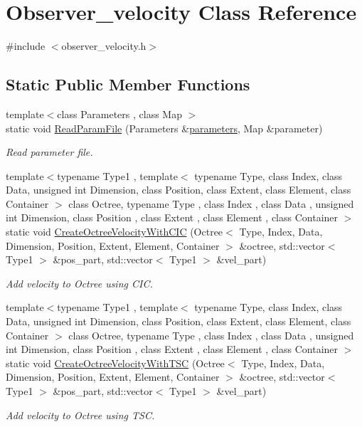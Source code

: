 \hypertarget{classObserver__velocity}{\section{Observer\-\_\-velocity Class Reference}
\label{classObserver__velocity}
}


{\ttfamily \#include $<$observer\-\_\-velocity.\-h$>$}

\subsection*{Static Public Member Functions}
\begin{DoxyCompactItemize}
\item 
{\footnotesize template$<$class Parameters , class Map $>$ }\\static void \hyperlink{classObserver__velocity_acafaae5aa6e6af9cadd712f54f08821e}{Read\-Param\-File} (Parameters \&\hyperlink{rays_8h_ae1bc8b0b8c8b9f8e4cc61a5cc7c4ce9e}{parameters}, Map \&parameter)
\begin{DoxyCompactList}\small\item\em Read parameter file. \end{DoxyCompactList}\item 
{\footnotesize template$<$typename Type1 , template$<$ typename Type, class Index, class Data, unsigned int Dimension, class Position, class Extent, class Element, class Container $>$ class Octree, typename Type , class Index , class Data , unsigned int Dimension, class Position , class Extent , class Element , class Container $>$ }\\static void \hyperlink{classObserver__velocity_a674b436ee4b99f2876e607c66332e63b}{Create\-Octree\-Velocity\-With\-C\-I\-C} (Octree$<$ Type, Index, Data, Dimension, Position, Extent, Element, Container $>$ \&octree, std\-::vector$<$ Type1 $>$ \&pos\-\_\-part, std\-::vector$<$ Type1 $>$ \&vel\-\_\-part)
\begin{DoxyCompactList}\small\item\em Add velocity to Octree using C\-I\-C. \end{DoxyCompactList}\item 
{\footnotesize template$<$typename Type1 , template$<$ typename Type, class Index, class Data, unsigned int Dimension, class Position, class Extent, class Element, class Container $>$ class Octree, typename Type , class Index , class Data , unsigned int Dimension, class Position , class Extent , class Element , class Container $>$ }\\static void \hyperlink{classObserver__velocity_a5dbabc0da68e01d7290564d152d6292a}{Create\-Octree\-Velocity\-With\-T\-S\-C} (Octree$<$ Type, Index, Data, Dimension, Position, Extent, Element, Container $>$ \&octree, std\-::vector$<$ Type1 $>$ \&pos\-\_\-part, std\-::vector$<$ Type1 $>$ \&vel\-\_\-part)
\begin{DoxyCompactList}\small\item\em Add velocity to Octree using T\-S\-C. \end{DoxyCompactList}\end{DoxyCompactItemize}


